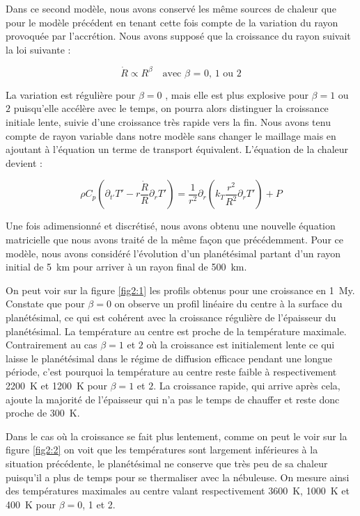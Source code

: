 \documentclass[10pt,a4paper]{article}
\numberwithin{equation}{section}
\begin{document}
Dans ce second modèle, nous avons conservé les même sources de chaleur que pour le modèle précédent en tenant cette fois compte de la variation du rayon provoquée par l'accrétion. Nous avons supposé que la croissance du rayon suivait la loi suivante :

\begin{equation}
\dot{R} \propto R^\beta  \quad \textrm{avec $\beta$ = 0, 1 ou 2}
\end{equation}

La variation est régulière pour $\beta = 0$ , mais elle est plus explosive pour $\beta = 1$ ou $2$ puisqu'elle accélère avec le temps, on pourra alors distinguer la croissance initiale lente, suivie d'une croissance très rapide vers la fin. 
Nous avons tenu compte de rayon variable dans notre modèle sans changer le maillage mais en ajoutant à l'équation un terme de transport équivalent. L'équation de la chaleur devient :

\begin{equation}
\rho C_p (\partial_{t'} T' - r \frac{\dot{R}}{R}\partial_{r} T')= \frac{1}{r^2} \partial_{r} ( k_{T} \frac{r^2}{R^2} \partial_{r} T')  + P
\end{equation}

Une fois adimensionné et discrétisé, nous avons obtenu une nouvelle équation matricielle que nous avons traité de la même façon que précédemment.
Pour ce modèle, nous avons considéré l'évolution d'un planétésimal partant d'un rayon initial de \SI{5}{km} pour arriver à un rayon final de \SI{500}{km}. 

On peut voir sur la figure \ref{fig2:1} les profils obtenus pour une croissance en \SI{1}{My}. Constate que pour $\beta = 0$ on observe un profil linéaire du centre à la surface du planétésimal, ce qui est cohérent avec la croissance régulière de l'épaisseur du planétésimal. La température au centre est proche de la température maximale. Contrairement au cas $\beta = 1$ et $2$ où la croissance est initialement lente ce qui laisse le planétésimal dans le régime de diffusion efficace pendant une longue période, c'est pourquoi la température au centre reste faible à respectivement \SI{2200}{K} et \SI{1200}{K} pour $\beta = 1$ et $2$. La croissance rapide, qui arrive après cela, ajoute la majorité de l'épaisseur qui n'a pas le temps de chauffer et reste donc proche de \SI{300}{K}.

Dans le cas où la croissance se fait plus lentement, comme on peut le voir sur la figure \ref{fig2:2} on voit que les températures sont largement inférieures à la situation précédente, le planétésimal ne conserve que très peu de sa chaleur puisqu'il a plus de temps pour se thermaliser avec la nébuleuse. On mesure ainsi des températures maximales au centre valant respectivement \SI{3600}{K}, \SI{1000}{K} et \SI{400}{K} pour $\beta = 0$, 1 et 2.
\end{document}

